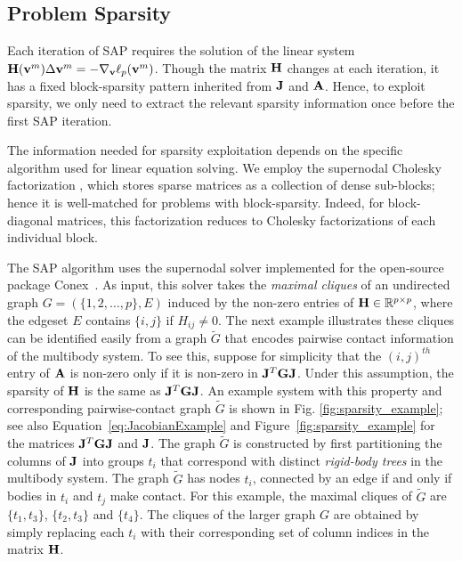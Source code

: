\subsection{Problem Sparsity}
\label{sec:problem_sparsity}

Each iteration of SAP requires the solution of the linear system
${\mathbf{H}}({\mathbf{v}}^m)\Delta{\mathbf{v}}^{m} = -\nabla_{\mathbf{v}}\ell_p({\mathbf{v}}^m)$.  Though
the matrix ${\mathbf{H}}$ changes at each iteration, it has a fixed block-sparsity
pattern inherited from ${\mathbf{J}}$ and ${\mathbf{A}}$.  
Hence, to exploit sparsity, we only need to extract the relevant
sparsity information once before the first SAP iteration.

The information needed for sparsity exploitation depends on the 
specific algorithm used for linear equation solving.
We employ the supernodal Cholesky factorization \cite[\S
9]{bib:davis2016survey},
which stores sparse matrices as a collection
of dense sub-blocks; hence it is well-matched for problems with block-sparsity.
Indeed, for block-diagonal matrices, this factorization
reduces to Cholesky factorizations of each individual block.

The SAP algorithm uses the supernodal solver implemented for the
open-source package Conex~\cite{bib:permenter2020}.
As input, this solver takes the \emph{maximal cliques} of  an
undirected graph 
$G = (\{1, 2, \ldots, p\}, E)$
induced by the non-zero entries of ${\mathbf{H}} \in \mathbb{R}^{p \times p}$,
where the edgeset $E$ contains $\{i, j\}$ if  $H_{ij} \ne 0$.
The next example illustrates these cliques can be identified
easily from a graph $\tilde G$ that encodes pairwise contact information
of  the multibody system. 
To see this, suppose for simplicity that the
$(i,j)^{th}$ entry of ${\mathbf{A}}$ is non-zero only if it
is non-zero in ${\mathbf{J}}^T {\mathbf{G}} {\mathbf{J}}$. 
Under this assumption,
the sparsity of ${\mathbf{H}}$ is the same as ${\mathbf{J}}^T {\mathbf{G}} {\mathbf{J}}$.
An example system with this property and corresponding
pairwise-contact graph $\tilde G$ is shown in Fig. \ref{fig:sparsity_example};
see also Equation~\ref{eq:JacobianExample}
and Figure~\ref{fig:sparsity_example} for the matrices
${\mathbf{J}}^T {\mathbf{G}} {\mathbf{J}}$ and ${\mathbf{J}}$.
The graph $\tilde G$ is constructed by first partitioning the columns of ${\mathbf{J}}$ into 
groups $t_i$ that correspond with  distinct \emph{rigid-body trees} in the multibody system.
The graph $\tilde G$ has nodes $t_i$,
connected by
an edge if and only if bodies in $t_i$ and $t_j$ make contact.  
For this example, the maximal cliques of $\tilde G$  are
$\{t_1, t_3\}$, $\{t_2, t_3\}$ and $\{t_4\}$.
The cliques of the larger graph $G$ are obtained by simply replacing each
$t_i$ with their corresponding set of column indices in the matrix ${\mathbf{H}}$.

